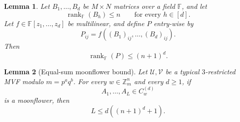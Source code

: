 \documentclass[10pt,a4paper]{amsart}
\newtheorem{lemma}{Lemma}
\def\U{\mathcal{U}}
\def\V{\mathcal{V}}
\newcommand{\Z}{\mathbb{Z}}
\begin{document}
\begin{lemma} \label{lem:polynomial_rank}
Let $B_1,\ldots,B_d$ be $M\times N$ matrices over a field $\mathbb F$, and let
\[
\operatorname{rank}_{\mathbb F}(B_h)\le n
\qquad
\text{for every }h\in[d].
\]
Let $f\in\mathbb F[z_1,\ldots,z_d]$ be multilinear, and define $P$ entry-wise by
\[
P_{ij}=f((B_1)_{ij},\ldots,(B_d)_{ij}).
\]
Then
\[
\operatorname{rank}_{\mathbb F}(P)\le (n+1)^d.
\]
\end{lemma}

\begin{lemma}[Equal-sum moonflower bound]\label{lem:equal-sum-moonflower}
Let $\U,\V$ be a typical $3$-restricted MVF modulo $m=p^aq^b$. For every $w\in\Z_m^n$ and every $d\ge 1$, if
\[
A_1,\ldots,A_L \in C_w^{(d)}
\]
is a moonflower, then
\[
L\le d\left((n+1)^d+1\right).
\]
\end{lemma}
\end{document}
